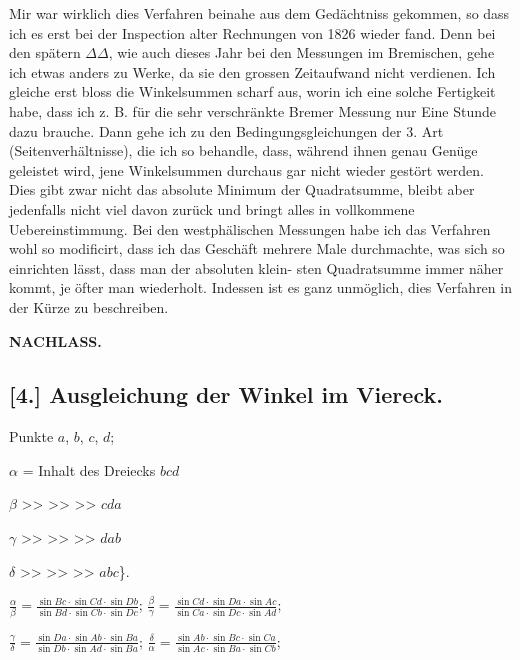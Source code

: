 \documentclass[12pt,a4paper]{article}
\theoremstyle{plain}
\theoremstyle{definition}
\theoremstyle{remark}
\begin{document}
Mir war wirklich dies Verfahren beinahe aus dem Ged\"achtniss gekommen,
so dass ich es erst bei der Inspection alter Rechnungen von 1826 wieder fand.
Denn bei den sp\"atern $\Delta\Delta$, wie auch dieses Jahr bei den Messungen im
Bremischen, gehe ich etwas anders zu Werke, da sie den grossen Zeitaufwand
nicht verdienen. Ich gleiche erst bloss die Winkelsummen scharf aus, worin
ich eine solche Fertigkeit habe, dass ich z. B. f\"ur die sehr verschr\"ankte
Bremer Messung nur Eine Stunde dazu brauche. Dann gehe ich zu den
Bedingungsgleichungen der 3. Art (Seitenverh\"altnisse), die ich so behandle, dass,
w\"ahrend ihnen genau Gen\"uge geleistet wird, jene Winkelsummen durchaus gar
nicht wieder gest\"ort werden. Dies gibt zwar nicht das absolute Minimum
der Quadratsumme, bleibt aber jedenfalls nicht viel davon zur\"uck und bringt
alles in vollkommene Uebereinstimmung. Bei den westph\"alischen Messungen
habe ich das Verfahren wohl so modificirt, dass ich das Gesch\"aft mehrere
Male durchmachte, was sich so einrichten l\"asst, dass man der absoluten klein-
sten Quadratsumme immer n\"aher kommt, je \"ofter man wiederholt. Indessen
ist es ganz unm\"oglich, dies Verfahren in der K\"urze zu beschreiben.


\newpage

\noindent\textbf{NACHLASS.}

\subsection*{[4.] Ausgleichung der Winkel im Viereck.}

Punkte $a$, $b$, $c$, $d$;

$\alpha$ = Inhalt des Dreiecks $bcd$

$\beta$ \quad >> \quad >> \quad >> \quad $cda$

$\gamma$ \quad >> \quad >> \quad >> \quad $dab$

$\delta$ \quad >> \quad >> \quad >> \quad $abc$\}.

$\displaystyle\frac{\alpha}{\beta} = \frac{\sin Bc \cdot \sin Cd \cdot \sin Db}{\sin Bd \cdot \sin Cb \cdot \sin Dc}$; $\displaystyle\frac{\beta}{\gamma} = \frac{\sin Cd \cdot \sin Da \cdot \sin Ac}{\sin Ca \cdot \sin Dc \cdot \sin Ad}$;

$\displaystyle\frac{\gamma}{\delta} = \frac{\sin Da \cdot \sin Ab \cdot \sin Ba}{\sin Db \cdot \sin Ad \cdot \sin Ba}$; $\displaystyle\frac{\delta}{\alpha} = \frac{\sin Ab \cdot \sin Bc \cdot \sin Ca}{\sin Ac \cdot \sin Ba \cdot \sin Cb}$;
\end{document}
